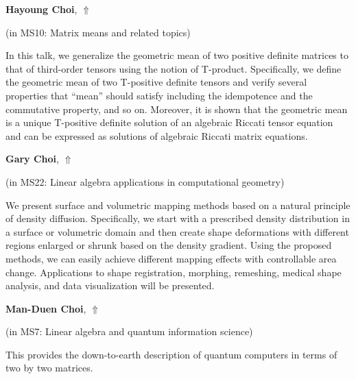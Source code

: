 \documentclass[ILAS2025-program.tex]{subfiles}
\begin{document}
\hypertarget{down0024}{}\begin{ilasabstract}
    
\textbf{Hayoung Choi},  \hfill \hyperlink{up0024}{$\Uparrow$}
    
    
(in {\color{mstitle}MS10: Matrix means and related topics})
        
\mtskip
    In this talk, we generalize the geometric mean of two positive definite matrices to that of third-order tensors using the notion of T-product. Specifically, we define the geometric mean of two T-positive definite tensors and verify several properties that ``mean'' should satisfy including the idempotence and the commutative property, and so on. Moreover, it is shown that the geometric mean is a unique T-positive definite solution of an algebraic Riccati tensor equation and can be expressed as solutions of algebraic Riccati matrix equations. 

\end{ilasabstract}
    

\hypertarget{down0034}{}\begin{ilasabstract}
    
\textbf{Gary Choi},  \hfill \hyperlink{up0034}{$\Uparrow$}
    
    
(in {\color{mstitle}MS22: Linear algebra applications in computational geometry})
        
\mtskip
    We present surface and volumetric mapping methods based on a natural principle of density diffusion. Specifically, we start with a prescribed density distribution in a surface or volumetric domain and then create shape deformations with different regions enlarged or shrunk based on the density gradient. Using the proposed methods, we can easily achieve different mapping effects with controllable area change. Applications to shape registration, morphing, remeshing, medical shape analysis, and data visualization will be presented. 

\end{ilasabstract}
    

\hypertarget{down0205}{}\begin{ilasabstract}
    
\textbf{Man-Duen Choi},  \hfill \hyperlink{up0205}{$\Uparrow$}
    
    
(in {\color{mstitle}MS7: Linear algebra and quantum information science})
        
\mtskip
    This provides the down-to-earth description of quantum computers in terms of two by two matrices.
\end{ilasabstract}
    
\end{document}
